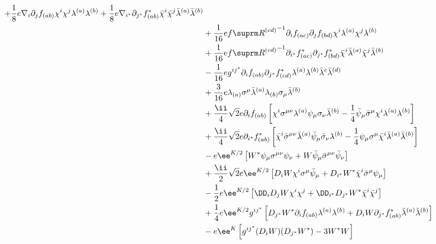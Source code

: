 \begin{align}
+\frac18e\nabla_i\partial_jf_{(ab)}\chi^i\chi^j\lambda^{(a)}\lambda^{(b)}
+\frac18e\nabla_{i^*}\partial_{j^*}f^*_{(ab)}\bar\chi^i\bar\chi^j\bar\lambda^{(a)}\bar\lambda^{(b)}
\notag\\&
+\frac1{16}e{\fR^{(cd)}}^{-1}\partial_if_{(ac)}\partial_jf_{(bd)}
             \chi^i\lambda^{(a)}\chi^j\lambda^{(b)}
\notag\\&
+\frac1{16}e{\fR^{(cd)}}^{-1}\partial_{i^*}f^*_{(ac)}\partial_{j^*}f^*_{(bd)}
             \bar\chi^i\bar\lambda^{(a)}\bar\chi^j\bar\lambda^{(b)}
\notag\\&
-\frac1{16}eg^{ij^*}\partial_if_{(ab)}\partial_{j^*}f^*_{(cd)}
             \lambda^{(a)}\lambda^{(b)}\bar\lambda^{c}\bar\lambda^{(d)}
\notag\\&
+\frac3{16}e\lambda_{(a)}\Sm\bar\lambda^{(a)}\lambda_{(b)}\sigma_\mu\bar\lambda^{(b)}
\notag\\&
+\frac\ii4\sqrt2 e\partial_{i}f_{(ab)}\left[
                \chi^i\sigma^{\mu\nu}\lambda^{(a)}\psi_\mu\sigma_\nu\bar\lambda^{(b)}
              - \frac14\bar\psi_\mu\bSm\chi^i\lambda^{(a)}\lambda^{(b)}\right]
\notag\\&
+\frac\ii4\sqrt2 e\partial_{i^*}f^*_{(ab)}\left[
              \bar\chi^i\bar\sigma^{\mu\nu}\bar\lambda^{(a)}\bar\psi_\mu\bar\sigma_\nu\lambda^{(b)}
            - \frac14\psi_\mu\Sm\bar\chi^i\bar\lambda^{(a)}\bar\lambda^{(b)}\right]
\notag\\&
-e\ee^{K/2}\left[W^*\psi_\mu\sigma^{\mu\nu}\psi_\nu
               + W  \bar\psi_\mu\bar\sigma^{\mu\nu}\bar\psi_\nu\right]
\notag\\&
+\frac\ii2\sqrt2e\ee^{K/2}\left[D_iW\chi^i\Sm\bar\psi_\mu
                              + D_{i^*}W^*\bar\chi^i\bSm\psi_\mu\right]
\notag\\&
-\frac12e\ee^{K/2}\left[\DD_i D_jW\chi^i\chi^j+\DD_{i^*}D_{j^*}W^*\bar\chi^i\bar\chi^j\right]
\notag\\&
+\frac14e\ee^{K/2}g^{ij^*}\left[ D_{j^*}W^*\partial_if_{(ab)}\lambda^{(a)}\lambda^{(b)}
                               + D_iW\partial_{j^*}f^*_{(ab)}\bar\lambda^{(a)}\bar\lambda^{(b)}
                          \right]
\notag\\&
-e\ee^{K}\left[g^{ij^*}(D_iW)(D_{j^*}W^*)-3W^*W\right]
\end{align}







